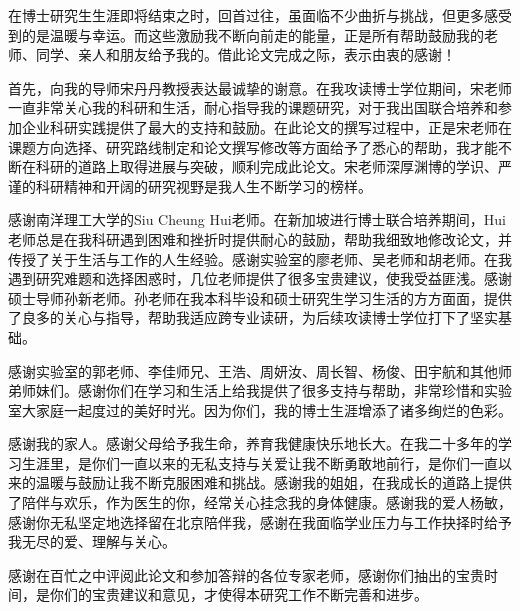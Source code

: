 
\begin{thanks}

在博士研究生生涯即将结束之时，回首过往，虽面临不少曲折与挑战，但更多感受到的是温暖与幸运。而这些激励我不断向前走的能量，正是所有帮助鼓励我的老师、同学、亲人和朋友给予我的。借此论文完成之际，表示由衷的感谢！

首先，向我的导师宋丹丹教授表达最诚挚的谢意。在我攻读博士学位期间，宋老师一直非常关心我的科研和生活，耐心指导我的课题研究，对于我出国联合培养和参加企业科研实践提供了最大的支持和鼓励。在此论文的撰写过程中，正是宋老师在课题方向选择、研究路线制定和论文撰写修改等方面给予了悉心的帮助，我才能不断在科研的道路上取得进展与突破，顺利完成此论文。宋老师深厚渊博的学识、严谨的科研精神和开阔的研究视野是我人生不断学习的榜样。

感谢南洋理工大学的Siu Cheung Hui老师。在新加坡进行博士联合培养期间，Hui老师总是在我科研遇到困难和挫折时提供耐心的鼓励，帮助我细致地修改论文，并传授了关于生活与工作的人生经验。感谢实验室的廖老师、吴老师和胡老师。在我遇到研究难题和选择困惑时，几位老师提供了很多宝贵建议，使我受益匪浅。感谢硕士导师孙新老师。孙老师在我本科毕设和硕士研究生学习生活的方方面面，提供了良多的关心与指导，帮助我适应跨专业读研，为后续攻读博士学位打下了坚实基础。

感谢实验室的郭老师、李佳师兄、王浩、周妍汝、周长智、杨俊、田宇航和其他师弟师妹们。感谢你们在学习和生活上给我提供了很多支持与帮助，非常珍惜和实验室大家庭一起度过的美好时光。因为你们，我的博士生涯增添了诸多绚烂的色彩。

感谢我的家人。感谢父母给予我生命，养育我健康快乐地长大。在我二十多年的学习生涯里，是你们一直以来的无私支持与关爱让我不断勇敢地前行，是你们一直以来的温暖与鼓励让我不断克服困难和挑战。感谢我的姐姐，在我成长的道路上提供了陪伴与欢乐，作为医生的你，经常关心挂念我的身体健康。感谢我的爱人杨敏，感谢你无私坚定地选择留在北京陪伴我，感谢在我面临学业压力与工作抉择时给予我无尽的爱、理解与关心。

感谢在百忙之中评阅此论文和参加答辩的各位专家老师，感谢你们抽出的宝贵时间，是你们的宝贵建议和意见，才使得本研究工作不断完善和进步。

\end{thanks}
